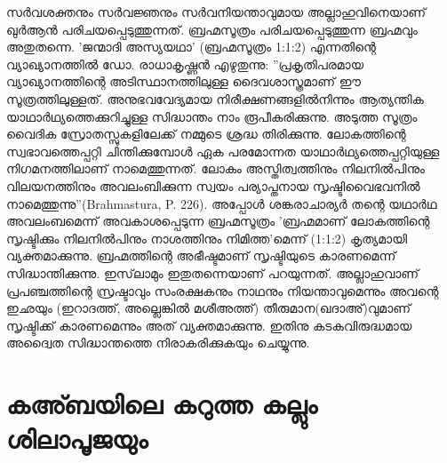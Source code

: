 സര്‍വശക്തനും സര്‍വജ്ഞനും സര്‍വനിയന്താവുമായ അല്ലാഹുവിനെയാണ് ഖുര്‍ആന്‍ പരിചയപ്പെടുത്തുന്നത്. ബ്രഹ്മസൂത്രം പരിചയപ്പെടുത്തുന്ന ബ്രഹ്മവും അതുതന്നെ.
'ജന്മാദി അസ്യയഥാ' (ബ്രഹ്മസൂത്രം 1:1:2) എന്നതിന്റെ വ്യാഖ്യാനത്തില്‍ ഡോ. രാധാകൃഷ്ണന്‍ എഴുതുന്നു: ''പ്രകൃതിപരമായ വ്യാഖ്യാനത്തിന്റെ അടിസ്ഥാനത്തിലുള്ള ദൈവശാസ്ത്രമാണ് ഈ സൂത്രത്തിലുള്ളത്. അനുഭവവേദ്യമായ നിരീക്ഷണങ്ങളില്‍നിന്നും ആത്യന്തിക യാഥാര്‍ഥ്യത്തെക്കുറിച്ചുള്ള സിദ്ധാന്തം നാം രൂപീകരിക്കുന്നു. അടുത്ത സൂത്രം വൈദിക സ്രോതസ്സുകളിലേക്ക് നമ്മുടെ ശ്രദ്ധ തിരിക്കുന്നു. ലോകത്തിന്റെ സ്വഭാവത്തെപ്പറ്റി ചിന്തിക്കുമ്പോള്‍ ഏക പരമോന്നത യാഥാര്‍ഥ്യത്തെപ്പറ്റിയുള്ള നിഗമനത്തിലാണ് നാമെത്തുന്നത്. ലോകം അസ്തിത്വത്തിനും നിലനില്‍പിനും വിലയനത്തിനും അവലംബിക്കുന്ന സ്വയം പര്യാപ്തനായ സൃഷ്ടിവൈഭവനില്‍ നാമെത്തുന്നു''(Brahmastura, P. 226).
അപ്പോള്‍ ശങ്കരാചാര്യര്‍ തന്റെ യഥാര്‍ഥ അവലംബമെന്ന് അവകാശപ്പെടുന്ന ബ്രഹ്മസൂത്രം 'ബ്രഹ്മമാണ് ലോകത്തിന്റെ സൃഷ്ടിക്കും നിലനില്‍പിനും നാശത്തിനും നിമിത്ത'മെന്ന് (1:1:2) കൃത്യമായി വ്യക്തമാക്കുന്നു. ബ്രഹ്മത്തിന്റെ അഭീഷ്ടമാണ് സൃഷ്ടിയുടെ കാരണമെന്ന് സിദ്ധാന്തിക്കുന്നു. ഇസ്‌ലാമും ഇതുതന്നെയാണ് പറയുന്നത്. അല്ലാഹുവാണ് പ്രപഞ്ചത്തിന്റെ സ്രഷ്ടാവും സംരക്ഷകനും നാഥനും നിയന്താവുമെന്നും അവന്റെ ഇഛയും (ഇറാദത്ത്, അല്ലെങ്കില്‍ മശീഅത്ത്) തീരുമാന(ഖദാഅ്)വുമാണ് സൃഷ്ടിക്ക് കാരണമെന്നും അത് വ്യക്തമാക്കുന്നു. ഇതിനു കടകവിരുദ്ധമായ അദ്വൈത സിദ്ധാന്തത്തെ നിരാകരിക്കുകയും ചെയ്യുന്നു.

\chapter{കഅ്ബയിലെ കറുത്ത കല്ലും ശിലാപൂജയും} 
